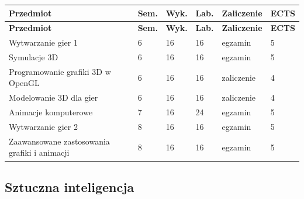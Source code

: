 \documentclass[12pt,a4paper]{article}
\newcommand{\thdrule}{\noalign{\global\setlength{\extrarowheight}{0pt}}}
\newcommand{\thdend}{\noalign{\global\setlength{\extrarowheight}{4pt}}}
\begin{document}
{\scriptsize
\begin{longtable}{m{6.5cm}m{0.7cm}m{1cm}m{1cm}m{1.7cm}m{0.7cm}}
\thdrule\toprule
\rowcolor{pjatkRed}
{\color{white}\footnotesize\textbf{\vphantom{Ag}Przedmiot}} & {\color{white}\footnotesize\textbf{\vphantom{Ag}Sem.}} & {\color{white}\footnotesize\textbf{\vphantom{Ag}Wyk.}} & {\color{white}\footnotesize\textbf{\vphantom{Ag}Lab.}} & {\color{white}\footnotesize\textbf{\vphantom{Ag}Zaliczenie}} & {\color{white}\footnotesize\textbf{\vphantom{Ag}ECTS}} \\
\midrule\thdend
\endfirsthead
\thdrule\toprule
\rowcolor{pjatkRed}
{\color{white}\footnotesize\textbf{\vphantom{Ag}Przedmiot}} & {\color{white}\footnotesize\textbf{\vphantom{Ag}Sem.}} & {\color{white}\footnotesize\textbf{\vphantom{Ag}Wyk.}} & {\color{white}\footnotesize\textbf{\vphantom{Ag}Lab.}} & {\color{white}\footnotesize\textbf{\vphantom{Ag}Zaliczenie}} & {\color{white}\footnotesize\textbf{\vphantom{Ag}ECTS}} \\
\midrule\thdend
\endhead
\rowcolor{tableRowLight} Wytwarzanie gier 1 & 6 & 16 & 16 & {\scriptsize egzamin} & 5 \\
\rowcolor{tableRowAlt} Symulacje 3D & 6 & 16 & 16 & {\scriptsize egzamin} & 5 \\
\rowcolor{tableRowLight} Programowanie grafiki 3D w OpenGL & 6 & 16 & 16 & {\scriptsize zaliczenie} & 4 \\
\rowcolor{tableRowAlt} Modelowanie 3D dla gier & 6 & 16 & 16 & {\scriptsize zaliczenie} & 4 \\
\rowcolor{tableRowLight} Animacje komputerowe & 7 & 16 & 24 & {\scriptsize egzamin} & 5 \\
\rowcolor{tableRowAlt} Wytwarzanie gier 2 & 8 & 16 & 16 & {\scriptsize egzamin} & 5 \\
\rowcolor{tableRowLight} Zaawansowane zastosowania grafiki i animacji & 8 & 16 & 16 & {\scriptsize egzamin} & 5 \\
\bottomrule
\end{longtable}}

\subsection*{Sztuczna inteligencja}
\end{document}
